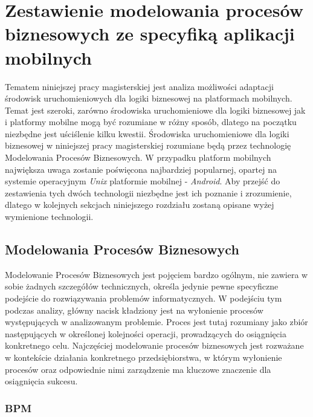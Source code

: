 \chapter{Zestawienie modelowania procesów biznesowych ze specyfiką aplikacji mobilnych}
\label{cha:bpmVSMobileApplications}

Tematem niniejszej pracy magisterskiej jest analiza możliwości adaptacji środowisk uruchomieniowych dla logiki biznesowej na platformach mobilnych. Temat jest szeroki, zarówno środowiska uruchomieniowe dla logiki biznesowej jak i platformy mobilne mogą być rozumiane w różny sposób, dlatego na początku niezbędne jest uściślenie kilku kwestii. Środowiska uruchomieniowe dla logiki biznesowej w niniejszej pracy magisterskiej rozumiane będą przez technologię Modelowania Procesów Biznesowych. W przypadku platform mobilnych największa uwaga zostanie poświęcona najbardziej popularnej, opartej na systemie operacyjnym \textit{Unix} platformie mobilnej - \textit{Android}. Aby przejść do zestawienia tych dwóch technologii niezbędne jest ich poznanie i zrozumienie, dlatego w kolejnych sekcjach niniejszego rozdziału zostaną opisane wyżej wymienione technologii.


\section{Modelowania Procesów Biznesowych}
\label{sec:analizaModelowaniaProcesowBiznesowych}

Modelowanie Procesów Biznesowych jest pojęciem bardzo ogólnym, nie zawiera w sobie żadnych szczegółów technicznych, określa jedynie pewne specyficzne podejście do rozwiązywania problemów informatycznych. W podejściu tym podczas analizy, główny nacisk kładziony jest na wyłonienie procesów występujących w analizowanym problemie. Proces jest tutaj rozumiany jako zbiór następujących w określonej kolejności operacji, prowadzących do osiągnięcia konkretnego celu. Najczęściej modelowanie procesów biznesowych jest rozważane w kontekście działania konkretnego przedsiębiorstwa, w którym wyłonienie procesów oraz odpowiednie nimi zarządzenie ma kluczowe znaczenie dla osiągnięcia sukcesu. 

\subsection{BPM}
\label{sec:bpm}

